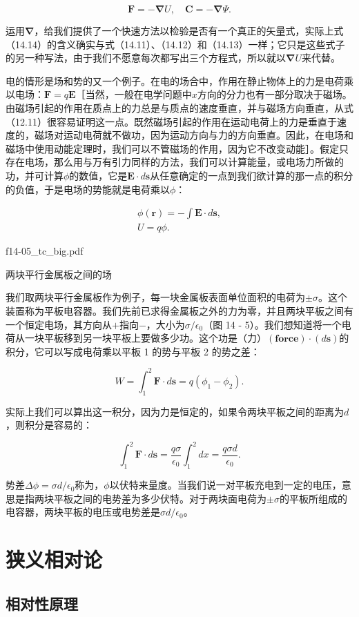 \documentclass[12pt,oneside]{book}
\providecommand{\FLPvec}[1]{\boldsymbol{#1}}
\providecommand{\FLPC}[0]{\FLPvec{C}}
\providecommand{\FLPE}[0]{\FLPvec{E}}
\providecommand{\FLPF}[0]{\FLPvec{F}}
\providecommand{\FLPr}[0]{\FLPvec{r}}
\providecommand{\FLPs}[0]{\FLPvec{s}}
\providecommand{\FLPnabla}[0]{\boldsymbol{\nabla}}
\providecommand{\FLPgrad}[1]{\FLPnabla{#1}}
\begin{document}
\begin{equation}
\label{Eq:I:14:14}
\FLPF=-\FLPgrad{U},\quad
\FLPC=-\FLPgrad{\Psi}.
\end{equation}

运用$\FLPnabla$，给我们提供了一个快速方法以检验是否有一个真正的矢量式，实际上式（14.14）的含义确实与式（14.11）、（14.12）和（14.13）一样；它只是这些式子的另一种写法，由于我们不愿意每次都写出三个方程式，所以就以$\FLPgrad{U}$来代替。


电的情形是场和势的又一个例子。在电的场合中，作用在静止物体上的力是电荷乘以电场：$\FLPF = q\FLPE$［当然，一般在电学问题中$x$方向的分力也有一部分取决于磁场。由磁场引起的作用在质点上的力总是与质点的速度垂直，并与磁场方向垂直，从式（12.11）很容易证明这一点。既然磁场引起的作用在运动电荷上的力是垂直于速度的，磁场对运动电荷就不做功，因为运动方向与力的方向垂直。因此，在电场和磁场中使用动能定理时，我们可以不管磁场的作用，因为它不改变动能］。假定只存在电场，那么用与万有引力同样的方法，我们可以计算能量，或电场力所做的功，并可计算$\phi$的数值，它是$\FLPE\cdot d\FLPs$从任意确定的一点到我们欲计算的那一点的积分的负值，于是电场的势能就是电荷乘以$\phi$：

\begin{gather*}
\phi(\FLPr)=-\int\FLPE\cdot d\FLPs,\\[1ex]
U=q\phi.
\end{gather*}


\begin{fig}{f14-05_tc_big.pdf}
\caption{两块平行金属板之间的场}
\label{fig:14-5}
\end{fig}

我们取两块平行金属板作为例子，每一块金属板表面单位面积的电荷为$\pm \sigma$。这个装置称为平板电容器。我们先前已求得金属板之外的力为零，并且两块平板之间有一个恒定电场，其方向从$+$指向$-$，大小为$\sigma/\epsilon_0$（图 14 - 5）。我们想知道将一个电荷从一块平板移到另一块平板上要做多少功。这个功是（力）$(\textbf{force})\cdot(d\FLPs)$的积分，它可以写成电荷乘以平板 1 的势与平板 2 的势之差：


\begin{equation*}
W=\int_1^2\FLPF\cdot d\FLPs=q(\phi_1-\phi_2).
\end{equation*}

实际上我们可以算出这一积分，因为力是恒定的，如果令两块平板之间的距离为$d$，则积分是容易的：


\begin{equation*}
\int_1^2\FLPF\cdot d\FLPs=\frac{q\sigma}{\epsilon_0}\int_1^2dx=
\frac{q\sigma d}{\epsilon_0}.
\end{equation*}

势差$\Delta\phi=\sigma d/\epsilon_0$称为，$\phi$以伏特来量度。当我们说一对平板充电到一定的电压，意思是指两块平板之间的电势差为多少伏特。对于两块面电荷为$\pm \sigma$的平板所组成的电容器，两块平板的电压或电势差是$\sigma d/\epsilon_0$。



\chapter{狭义相对论}
\section{相对性原理}
\end{document}

